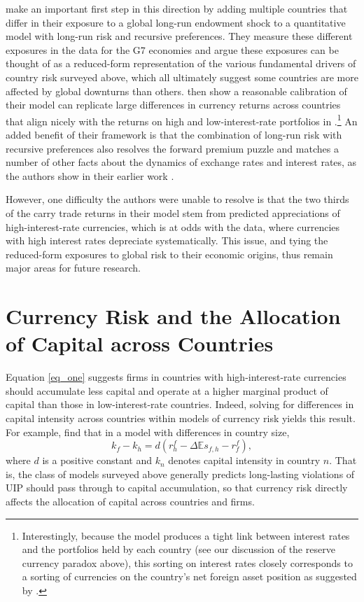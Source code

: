 \documentclass{ar-1col}
\begin{document}
\citet{ColacitoCroceGavazzoniReady2018} make an important first step in this direction by adding multiple countries that differ in their exposure to a global long-run endowment shock to a quantitative model with long-run risk and recursive preferences. They measure these different exposures in the data for the G7 economies and argue these exposures can be thought of as a reduced-form representation of the various fundamental drivers of country risk surveyed above, which all ultimately suggest some countries are more affected by global downturns than others. \citet{ColacitoCroceGavazzoniReady2018} then show a reasonable calibration of their model can replicate large differences in currency returns across countries that align nicely with the returns on high and low-interest-rate portfolios in \cite{LustigRoussanovVerdelhan2011}.\footnote{ Interestingly, because the model produces a tight link between interest rates and the portfolios held by each country (see our discussion of the reserve currency paradox above), this sorting on interest rates closely corresponds to a sorting of currencies on the country's net foreign asset position as suggested by \citet{DellaCorteetal2016}.} 
An added benefit of their framework is that the combination of long-run risk with recursive preferences also resolves the forward premium puzzle and matches a number of other facts about the dynamics of exchange rates and interest rates, as the authors show in their earlier work \citep{ColacitoCroce2011}. 

However, one difficulty the authors were unable to resolve is that the two thirds of the carry trade returns in their model stem from predicted appreciations of high-interest-rate currencies, which is at odds with the data, where currencies with high interest rates depreciate systematically. This issue, and tying the reduced-form exposures to global risk to their economic origins, thus remain major areas for future research.


\section{Currency Risk and the Allocation of Capital across Countries\label{sec_capital}}

Equation \ref{eq_one} suggests firms in countries with high-interest-rate currencies should accumulate less capital and operate at a higher marginal product of capital than those in low-interest-rate countries. Indeed, solving for differences in capital intensity across countries within models of currency risk yields this result. For example, \citet{HassanMertensZhang2015} find that in a model with differences in country size,  
\begin{equation}
    k_f - k_h = d
    \left(r^f_h - \Delta \mathbb{E} s_{f, h} - r^f_f \right),
\end{equation}
where $d$ is a positive constant and $k_n$ denotes capital intensity in country $n$. That is, the class of models surveyed above generally predicts long-lasting violations of UIP should pass through to capital accumulation, so that currency risk directly affects the allocation of capital across countries and firms.
\end{document}
